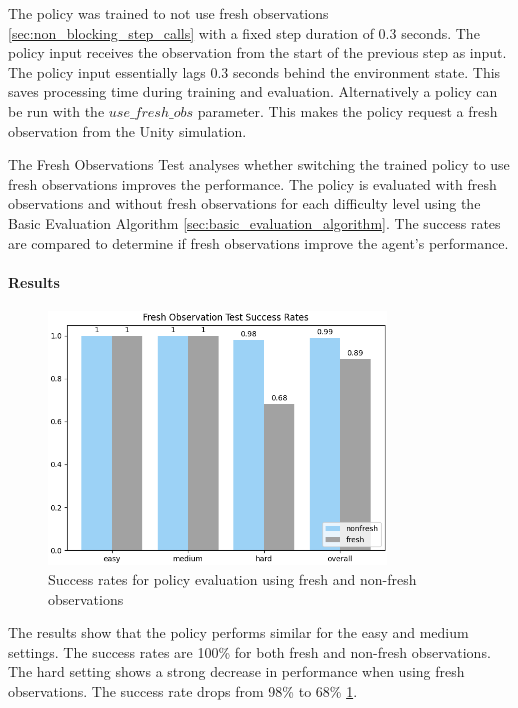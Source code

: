 The policy was trained to not use fresh observations \ref{sec:non_blocking_step_calls} with a fixed step duration of 0.3 seconds. The policy input receives the observation from the start of the previous step as input. The policy input essentially lags 0.3 seconds behind the environment state. This saves processing time during training and evaluation. Alternatively a policy can be run with the $use\_fresh\_obs$ parameter. This makes the policy request a fresh observation from the Unity simulation.

The Fresh Observations Test analyses whether switching the trained policy to use fresh observations improves the performance. The policy is evaluated with fresh observations and without fresh observations for each difficulty level using the Basic Evaluation Algorithm \ref{sec:basic_evaluation_algorithm}. The success rates are compared to determine if fresh observations improve the agent's performance.

\paragraph{Results}

\begin{figure}
    \centering
    \includegraphics[width=0.8\textwidth]{Bilder/notebook_images/hardDistanceMixedLight_eval_freshNonFresh_success_rates_barplot.png}
    \caption{Success rates for policy evaluation using fresh and non-fresh observations}
    \label{fig:fresh_observations_test_result}
\end{figure}

The results show that the policy performs similar for the easy and medium settings. The success rates are 100\% for both fresh and non-fresh observations. The hard setting shows a strong decrease in performance when using fresh observations. The success rate drops from 98\% to 68\% \ref{fig:fresh_observations_test_result}.

